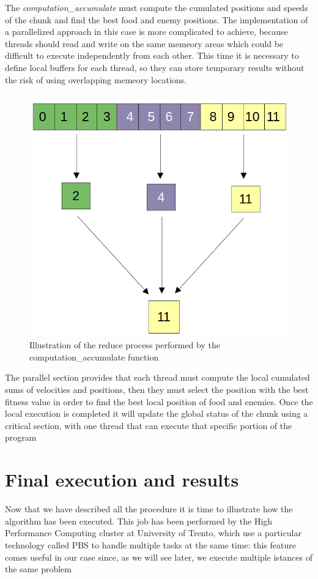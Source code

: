 \documentclass[10pt]{article}
\begin{document}
\begin{multicols}{2}
The \textit{computation\_accumulate}  must compute
the cumulated positions and speeds of the chunk and find the best food and enemy positions.
The implementation of a parallelized approach in this case  is more complicated to achieve, 
because threads should read and write on the same memeory areas which could be 
difficult to execute independently from each other. This time it is necessary to define
local buffers for each thread, so they can store temporary results without the risk of using
overlapping memeory locations. 
\begin{figure}[H]
  \includegraphics[scale=0.2]{img/reduce-example.png}
  \centering
  \caption{Illustration of the reduce process performed by the computation\_accumulate function}
\end{figure}
\noindent The parallel section provides that each thread must compute the local
cumulated sums of velocities and positions, then they must select the position with the best fitness value
in order to find the best local position of food and enemies. Once the local execution is completed
it will update the global status of the chunk using a critical section, with one thread that can execute that
specific portion of the program

\section{Final execution and results}
Now that we have described all the procedure it is time to illustrate how 
the algorithm has been executed. This job has been performed by the
High Performance Computing cluster at University of Trento, which 
use a particular technology called PBS to handle multiple tasks at the same
time: this feature comes useful in our case since, as we will see later, we 
execute multiple istances of the same problem

\end{multicols}
\end{document}
